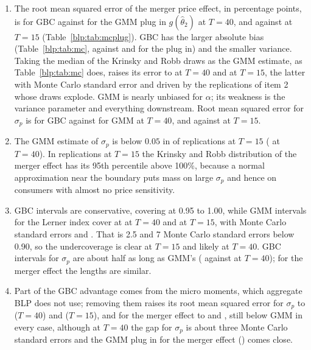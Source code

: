 \begin{enumerate}
\item The root mean squared error of the merger price effect, in percentage points, is \nummcdprmsegbcxl{} for GBC against \nummcdprmseplugxl{} for the GMM plug in $g(\hat\theta_2)$ at $T=40$, and \nummcdprmsegbcxv{} against \nummcdprmseplugxv{} at $T=15$ (Table~\ref{blp:tab:mcplug}). GBC has the larger absolute bias (Table~\ref{blp:tab:mc}, against \nummcdpbiasplugxl{} and \nummcdpbiasplugxv{} for the plug in) and the smaller variance. Taking the median of the Krinsky and Robb draws as the GMM estimate, as Table~\ref{blp:tab:mc} does, raises its error to \nummcdprmsegmmxl{} at $T=40$ and \nummcdprmsegmmxv{} at $T=15$, the latter with Monte Carlo standard error \nummcdprmsesegmmxv{} and driven by the replications of item 2 whose draws explode. GMM is nearly unbiased for $\alpha$; its weakness is the variance parameter and everything downstream. Root
mean squared error for $\sigma_p$ is \nummcsprmsegbcxl{} for GBC against \nummcsprmsegmmxl{} for
GMM at $T=40$, and \nummcsprmsegbcxv{} against \nummcsprmsegmmxv{} at $T=15$.
\item The GMM estimate of $\sigma_p$ is below $0.05$ in \nummcboundxv{} of
\nummcnxv{} replications at $T=15$ (\nummcboundxl{} at $T=40$). In \nummcexplxv{} replications at
$T=15$ the Krinsky and Robb distribution of the merger effect has its 95th percentile above
100\%, because a normal approximation near the boundary puts mass on large $\sigma_p$ and
hence on consumers with almost no price sensitivity. 
\item GBC intervals are conservative, covering at 0.95 to 1.00, while
GMM intervals for the Lerner index cover at \nummclercovgmmxl{} at $T=40$ and \nummclercovgmmxv{} at $T=15$, with Monte Carlo standard errors \nummclercovsegmmxl{} and \nummclercovsegmmxv{}. That is 2.5 and 7 Monte Carlo standard errors below 0.90, so the undercoverage is clear at $T=15$ and likely at $T=40$. GBC intervals for $\sigma_p$ are about half
as long as GMM's (\nummcsplengbcxl{} against \nummcsplengmmxl{} at $T=40$); for the merger effect
the lengths are similar.
\item Part of the GBC advantage comes from the micro moments, which aggregate BLP does not use; removing them raises its root mean squared error for $\sigma_p$ to
\nummcsprmsenmxl{} ($T=40$) and \nummcsprmsenmxv{} ($T=15$), and for the merger effect to
\nummcdprmsenmxl{} and \nummcdprmsenmxv{}, still below GMM in every case, although at $T=40$ the gap for $\sigma_p$ is about three Monte Carlo standard errors and the GMM plug in for the merger effect (\nummcdprmseplugxl{}) comes close.

\end{enumerate}

